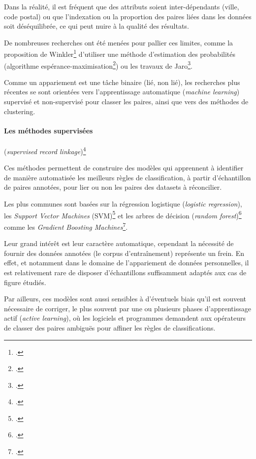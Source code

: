 \documentclass[a4paper,12pt,twoside]{book}
\begin{document}
			    Dans la réalité, il est fréquent que des attributs soient inter-dépendants (ville, code postal) ou que l'indexation ou la proportion des paires liées dans les données soit déséquilibrée, ce qui peut nuire à la qualité des résultats.
			    
			    De nombreuses recherches ont été menées pour pallier ces limites, comme la proposition de Winkler\footcite{winklerUsingEMAlgorithm2002} d'utiliser une méthode d'estimation des probabilités (algorithme espérance-maximisation\footcite{AlgorithmeEsperancemaximisation2022}) ou les travaux de Jaro\footcite{jaroAdvancesRecordLinkageMethodology1989}.
			    
			    Comme un appariement est une tâche binaire (lié, non lié), les recherches plus récentes se sont orientées vers l'apprentissage automatique (\textit{machine learning}) supervisé et non-supervisé pour classer les paires, ainsi que vers des méthodes de clustering.
			    \pagebreak
			    
			    \paragraph{Les \textbf{méthodes supervisées}} (\textit{supervised record linkage})\footcites[][]{pitaApplyingMachineLearning2017}[][pp.~:142-147]{christenDataMatchingConcepts2012}
			    
			    Ces méthodes permettent de construire des modèles qui apprennent à identifier de manière automatisée les meilleurs règles de classification, à partir d'échantillon de paires annotées, pour lier ou non les paires des datasets à réconcilier.
			    
			    Les plus communes sont basées sur la régression logistique (\textit{logistic regression}), les \textit{Support Vector Machines} (SVM)\footcite{MachineVecteursSupport2022} et les arbres de décision (\textit{random forest})\footcite{RandomForest2022} comme les \textit{Gradient Boosting Machines}\footcite{ApprentissageParRenforcement2022}.
			    
			    Leur grand intérêt est leur caractère automatique, cependant la nécessité de fournir des données annotées (le corpus d'entraînement) représente un frein. En effet, et notamment dans le domaine de l'appariement de données personnelles, il est relativement rare de disposer d'échantillons suffisamment adaptés aux cas de figure étudiés.
			    
			    Par ailleurs, ces modèles sont aussi sensibles à d'éventuels biais qu'il est souvent nécessaire de corriger, le plus souvent par une ou plusieurs phases d'apprentissage actif (\textit{active learning}), où les logiciels et programmes demandent aux opérateurs de classer des paires ambiguës pour affiner les règles de classifications.
			    
\end{document}
